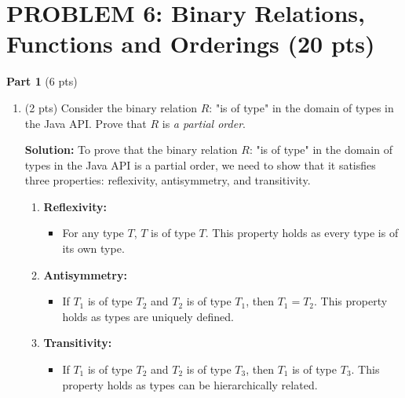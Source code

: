 \documentclass[12pt]{article}
\begin{document}
\begin{spacing}{1.5}
\begin{enumerate}
	\end{enumerate}
				     
	\newpage
	\section*{PROBLEM 6: Binary Relations, Functions and Orderings (20 pts)}
			
	\textbf{Part 1} (6 pts)
			
	\begin{enumerate}
		\item (2 pts) Consider the binary relation $R$: "is of type" in the domain of types in the Java API. Prove that $R$ is \textit{a partial order}.
		      		      		      
		      \textbf{Solution:} To prove that the binary relation $R$: "is of type" in the domain of types in the Java API is a partial order, we need to show that it satisfies three properties: reflexivity, antisymmetry, and transitivity.
		      		      		      
		      \begin{enumerate}
		      	\item \textbf{Reflexivity:}
		      	      \begin{itemize}
		      	      	\item For any type $T$, $T$ is of type $T$. This property holds as every type is of its own type.
		      	      \end{itemize}
		      	      		      	      		      	      
		      	\item \textbf{Antisymmetry:}
		      	      \begin{itemize}
		      	      	\item If $T_1$ is of type $T_2$ and $T_2$ is of type $T_1$, then $T_1 = T_2$. This property holds as types are uniquely defined.
		      	      \end{itemize}
		      	      		      	      		      	      
		      	\item \textbf{Transitivity:}
		      	      \begin{itemize}
		      	      	\item If $T_1$ is of type $T_2$ and $T_2$ is of type $T_3$, then $T_1$ is of type $T_3$. This property holds as types can be hierarchically related.
		      	      \end{itemize}
		      \end{enumerate}
		      		      		      

\end{enumerate}
\end{spacing}
\end{document}

